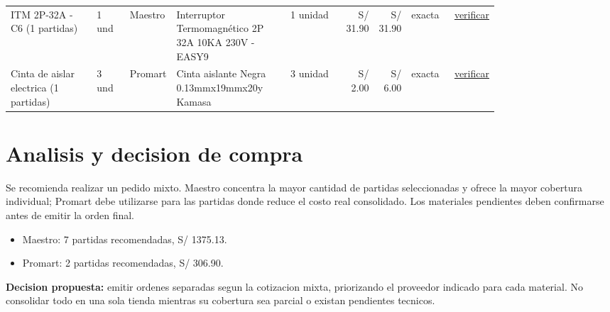 \documentclass[11pt,a4paper]{article}
\begin{document}
\begin{landscape}
\begin{longtable}{p{0.19\linewidth} p{0.07\linewidth} p{0.09\linewidth} p{0.24\linewidth} p{0.12\linewidth} r r p{0.09\linewidth} c}
ITM 2P-32A - C6 (1 partidas) & 1 und & Maestro & Interruptor Termomagnético 2P 32A 10KA 230V - EASY9 & 1 unidad & S/ 31.90 & S/ 31.90 & exacta & \href{\detokenize{https://www.falabella.com.pe/falabella-pe/search?Ntt=interruptor+termomagnetico+2+polos+32A}}{verificar} \\
Cinta de aislar electrica (1 partidas) & 3 und & Promart & Cinta aislante Negra 0.13mmx19mmx20y Kamasa & 3 unidad & S/ 2.00 & S/ 6.00 & exacta & \href{\detokenize{https://www.promart.pe/cinta-aislante-negra-0-13mmx19mmx20y/p}}{verificar} \\
\bottomrule
\end{longtable}
\normalsize
\end{landscape}

\section{Analisis y decision de compra}
Se recomienda realizar un pedido mixto. Maestro concentra la mayor cantidad de partidas seleccionadas y ofrece la mayor cobertura individual; Promart debe utilizarse para las partidas donde reduce el costo real consolidado. Los materiales pendientes deben confirmarse antes de emitir la orden final.

\begin{itemize}
\item Maestro: 7 partidas recomendadas, S/ 1375.13.
\item Promart: 2 partidas recomendadas, S/ 306.90.
\end{itemize}

\textbf{Decision propuesta:} emitir ordenes separadas segun la cotizacion mixta, priorizando el proveedor indicado para cada material. No consolidar todo en una sola tienda mientras su cobertura sea parcial o existan pendientes tecnicos.
\end{document}
